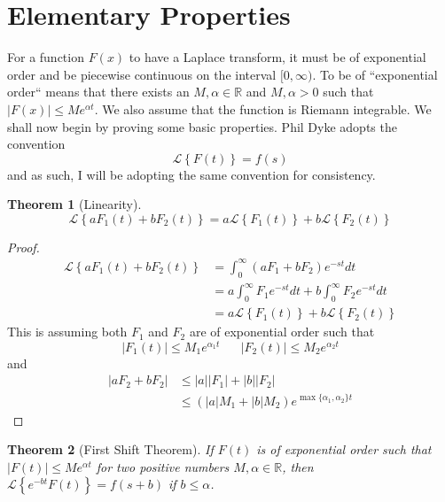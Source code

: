 \documentclass{report}
\newtheorem{theorem}{Theorem}[chapter]
\theoremstyle{definition}
\theoremstyle{remark}
\newcommand{\lapt}[1]{\mathscr{L}\left\{ #1\right\}}
\newcommand{\R}{\mathbb{R}}
\newcommand{\twen}{\hspace{20pt}}
\begin{document}
\section{Elementary Properties}
For a function $F(x)$ to have a Laplace transform, it must be of exponential order and be piecewise continuous on the interval $[0,\infty)$. To be of ``exponential order`` means that there exists an $M,\alpha \in \R$ and $M,\alpha >0$ such that $|F(x)| \leq Me^{\alpha t}$. We also assume that the function is Riemann integrable. We shall now begin by proving some basic properties. Phil Dyke adopts the convention 
\begin{equation*}
    \lapt{F(t)} = f(s)
\end{equation*}
and as such, I will be adopting the same convention for consistency.
\begin{theorem}[Linearity]
\begin{equation*}
    \lapt{aF_1(t) + bF_2(t)} = a\lapt{F_1(t)} + b\lapt{F_2(t)}
\end{equation*}
\end{theorem}
\begin{proof}
    \begin{equation*}
    \begin{split}
        \lapt{aF_1(t) + bF_2(t)}& = \int^\infty_0 (aF_1+bF_2)e^{-st} dt \\
        &=a\int^\infty_0F_1e^{-st}dt + b\int^\infty_0F_2e^{-st}dt \\
        &= a\lapt{F_1(t)} + b\lapt{F_2(t)}
    \end{split}
    \end{equation*}
    This is assuming both $F_1$ and $F_2$ are of exponential order such that 
    \begin{equation*}
        |F_1(t)| \leq M_1 e^{\alpha_1t} \twen |F_2(t)| \leq M_2e^{\alpha_2t}
    \end{equation*} 
    and \begin{equation*}
        \begin{split}
            |aF_2+bF_2| &\leq |a||F_1| + |b||F_2| \\
            &\leq (|a|M_1+|b|M_2)e^{\max\{ \alpha_1,\alpha_2 \}t}
        \end{split}
    \end{equation*}
\end{proof}
\begin{theorem}[First Shift Theorem]
    If $F(t)$ is of exponential order such that $|F(t)| \leq Me^{\alpha t}$ for two positive numbers $M,\alpha \in \R$, then  $\lapt{e^{-bt}F(t)}=f(s+b)$ if $b\leq \alpha$.\label{theo:fst}
\end{theorem}
\end{document}
